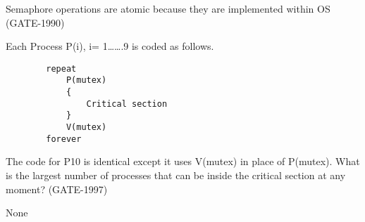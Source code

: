 
\begin{questyle}

  \question  Semaphore operations are atomic because they are implemented within OS \fillin[] (GATE-1990)

  \end{questyle}




\begin{questyle}

  \question  Each Process P(i), i= 1…….9 is coded as follows.
    \begin{lstlisting}
        repeat
            P(mutex)
            {
                Critical section
            }
            V(mutex)
        forever
    \end{lstlisting}
    The code for P10 is identical except it uses V(mutex) in place of P(mutex). What is the largest number of processes that can be inside the critical section at any moment? (GATE-1997)

  \begin{oneparchoices}
    \choice None
  \end{oneparchoices}

  \end{questyle}




